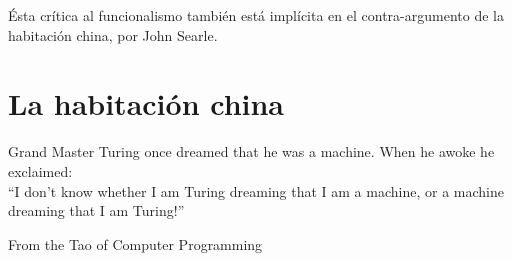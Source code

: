 \documentclass[12pt]{memoir}
\begin{document}
Ésta crítica al funcionalismo también está implícita en el contra-argumento de la habitación china, por John Searle.

\section{La habitación china}

\newpage

\printbibliography

\newpage


\epigraph{Grand Master Turing once dreamed that he was a machine. When he awoke he exclaimed: \\

“I don't know whether I am Turing dreaming that I am a machine, or a machine dreaming that I am Turing!”}{From the Tao of Computer Programming}
\end{document}
